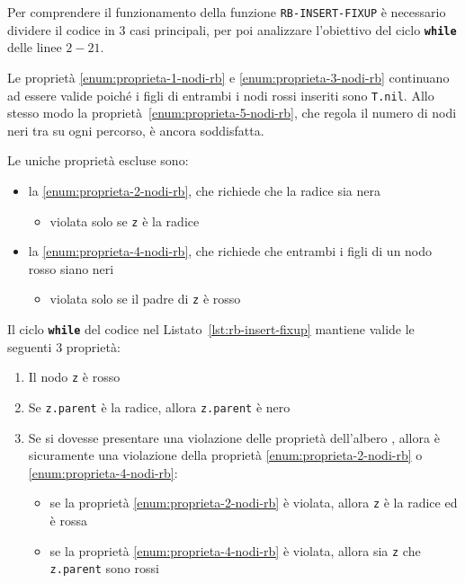 \documentclass[italian, 10pt]{article}
\begin{document}
Per comprendere il funzionamento della funzione \texttt{RB-INSERT-FIXUP} è necessario dividere il codice in \(3\) casi principali, per poi analizzare l'obiettivo del ciclo \textbf{\texttt{while}} delle linee \(2-21\).

Le proprietà \ref{enum:proprieta-1-nodi-rb} e \ref{enum:proprieta-3-nodi-rb} continuano ad essere valide poiché i figli di entrambi i nodi rossi inseriti sono \texttt{T.nil}.
Allo stesso modo la proprietà~\ref{enum:proprieta-5-nodi-rb}, che regola il numero di nodi neri tra su ogni percorso, è ancora soddisfatta.

Le uniche proprietà escluse sono:

\begin{itemize}
  \item la \ref{enum:proprieta-2-nodi-rb}, che richiede che la radice sia nera
        \begin{itemize}
          \item violata solo se \texttt{z} è la radice
        \end{itemize}
  \item la \ref{enum:proprieta-4-nodi-rb}, che richiede che entrambi i figli di un nodo rosso siano neri
        \begin{itemize}
          \item violata solo se il padre di \texttt{z} è rosso
        \end{itemize}
\end{itemize}

\bigskip
Il ciclo \textbf{\texttt{while}} del codice nel Listato~\ref{lst:rb-insert-fixup} mantiene valide le seguenti \(3\) proprietà:

\begin{enumerate}
  \item Il nodo \texttt{z} è rosso
  \item Se \texttt{z.parent} è la radice, allora \texttt{z.parent} è nero
  \item Se si dovesse presentare una violazione delle proprietà dell'albero \RB, allora è sicuramente una violazione della proprietà \ref{enum:proprieta-2-nodi-rb} o \ref{enum:proprieta-4-nodi-rb}:
        \begin{itemize}
          \item se la proprietà \ref{enum:proprieta-2-nodi-rb} è violata, allora \texttt{z} è la radice ed è rossa
          \item se la proprietà \ref{enum:proprieta-4-nodi-rb} è violata, allora sia \texttt{z} che \texttt{z.parent} sono rossi
        \end{itemize}
\end{enumerate}
\end{document}
